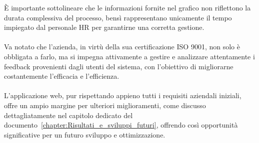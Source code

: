 È importante sottolineare che le informazioni fornite nel grafico non riflettono la durata complessiva del processo, 
bensì rappresentano unicamente il tempo impiegato dal personale HR per garantirne una corretta gestione.
%
\\ \\
Va notato che l'azienda, in virtù della sua certificazione ISO 9001, non solo è obbligata a farlo, 
ma si impegna attivamente a gestire e analizzare attentamente i feedback provenienti dagli utenti del sistema, 
con l'obiettivo di migliorarne costantemente l'efficacia e l'efficienza.
\\ \\
L'applicazione web, pur rispettando appieno tutti i requisiti aziendali iniziali, 
offre un ampio margine per ulteriori miglioramenti, come discusso dettagliatamente nel capitolo dedicato del documento~\ref{chapter:Risultati_e_sviluppi_futuri}, 
offrendo così opportunità significative per un futuro sviluppo e ottimizzazione.